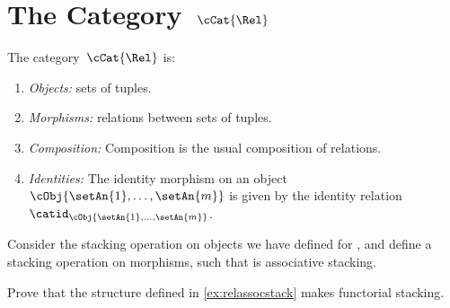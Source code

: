 
\section{The Category~$\cCat{\Rel}$}

\begin{definition}
    \label{def:RelL}
    The category~$\cCat{\Rel}$ is:
    \begin{enumerate}
        \item \emph{Objects:} sets of tuples.
        \item \emph{Morphisms:}
              relations between sets of tuples.
        \item \emph{Composition:}
              Composition is the usual composition of relations.
        \item \emph{Identities:}
              The identity morphism on an object~$\cObj{\setAn{1},\ldots, \setAn{m}}$ is given by the identity relation~$\catid_{\cObj{\setAn{1},\ldots, \setAn{m}}}$.
    \end{enumerate}
\end{definition}

\begin{exercise}
    \label{ex:relassocstack}
    Consider the stacking operation on objects we have defined for \cCat{\Set}, and define a stacking operation on morphisms, such that \cCat{\Rel} is associative stacking.
\end{exercise}

\begin{solution}
\end{solution}
\begin{exercise}
    \label{ex:relfuncstack}
    Prove that the structure defined in \cref{ex:relassocstack} makes \cCat{\Rel} functorial stacking.
\end{exercise}

\begin{solution}
\end{solution}

